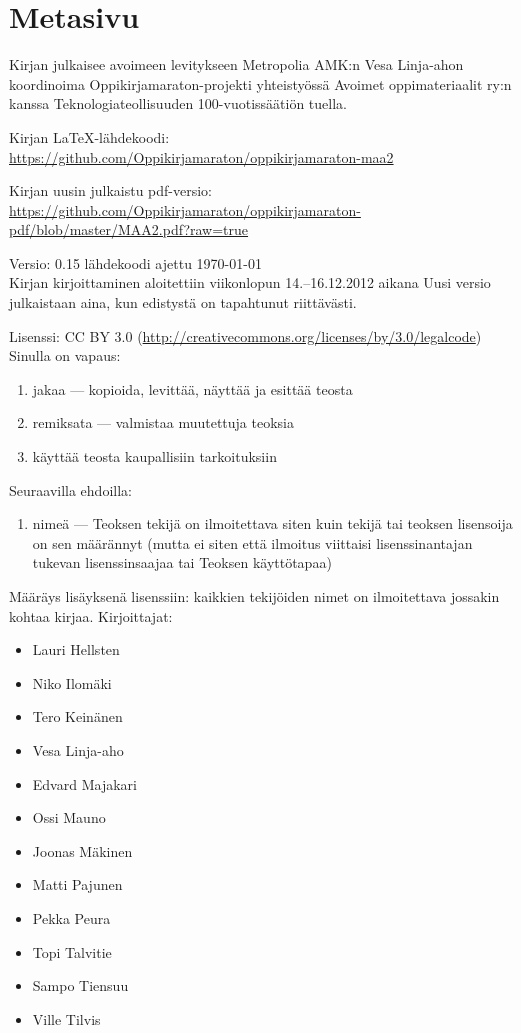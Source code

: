 \newpage
\section*{Metasivu}

Kirjan julkaisee avoimeen levitykseen Metropolia AMK:n Vesa Linja-ahon koordinoima Oppikirjamaraton-projekti yhteistyössä Avoimet oppimateriaalit ry:n kanssa Teknologiateollisuuden 100-vuotissäätiön tuella.

Kirjan LaTeX-lähdekoodi: \\
\url{https://github.com/Oppikirjamaraton/oppikirjamaraton-maa2}

Kirjan uusin julkaistu pdf-versio: \\
\url{https://github.com/Oppikirjamaraton/oppikirjamaraton-pdf/blob/master/MAA2.pdf?raw=true}

Versio: 0.15 \qquad lähdekoodi ajettu \today \\
Kirjan kirjoittaminen aloitettiin viikonlopun 14.--16.12.2012 aikana
Uusi versio julkaistaan aina, kun edistystä on tapahtunut riittävästi.

Lisenssi: CC BY 3.0 (\url{http://creativecommons.org/licenses/by/3.0/legalcode})\\
Sinulla on vapaus:
\begin{enumerate}
\item jakaa — kopioida, levittää, näyttää ja esittää teosta
\item remiksata — valmistaa muutettuja teoksia
\item käyttää teosta kaupallisiin tarkoituksiin
\end{enumerate}
Seuraavilla ehdoilla:
\begin{enumerate}
\item nimeä — Teoksen tekijä on ilmoitettava siten kuin tekijä tai teoksen lisensoija on sen määrännyt (mutta ei siten että ilmoitus viittaisi lisenssinantajan tukevan lisenssinsaajaa tai Teoksen käyttötapaa)
\end{enumerate}

Määräys lisäyksenä lisenssiin: kaikkien tekijöiden nimet on ilmoitettava jossakin kohtaa kirjaa.
Kirjoittajat:
\begin{itemize}
\item Lauri Hellsten
\item Niko Ilomäki
\item Tero Keinänen
\item Vesa Linja-aho
\item Edvard Majakari
\item Ossi Mauno
\item Joonas Mäkinen
\item Matti Pajunen
\item Pekka Peura
\item Topi Talvitie
\item Sampo Tiensuu
\item Ville Tilvis
\end{itemize}

